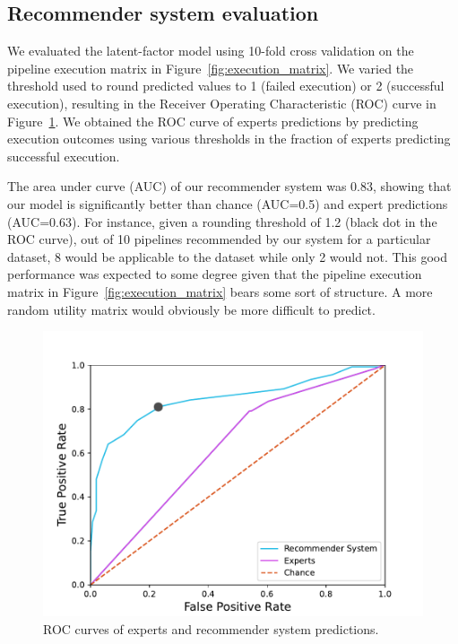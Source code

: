 
\subsection{Recommender system evaluation} 

We evaluated the latent-factor model using 10-fold cross validation on the
pipeline execution matrix in Figure~\ref{fig:execution_matrix}. We varied
the threshold used to round predicted values to 1 (failed execution) or 2
(successful execution), resulting in the Receiver Operating Characteristic
(ROC) curve  in Figure~\ref{fig:roc-curve}. We obtained the ROC curve of
experts predictions by predicting execution outcomes using various
thresholds in the fraction of experts predicting successful execution. 

The area under curve (AUC) of our recommender system was 0.83, showing that
our model is significantly better than chance (AUC=0.5) and expert
predictions (AUC=0.63). For instance, given a rounding threshold of 1.2
(black dot in the ROC curve), out of 10 pipelines
recommended by our system for a particular dataset, 8 would be applicable to
the dataset while only 2 would not. This good performance was expected to some degree given that the pipeline execution matrix in
Figure~\ref{fig:execution_matrix} bears some sort of structure. 
A more random utility matrix would obviously be more difficult to predict.

\begin{figure}
\centering
  \includegraphics[width=\columnwidth]{figures/ROC Curve.pdf}
  \caption{ROC curves of experts and recommender system predictions.}
  \label{fig:roc-curve}
\end{figure}

